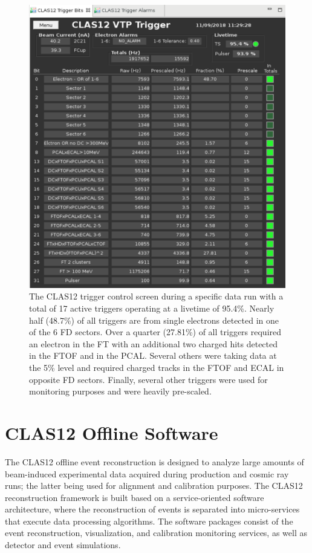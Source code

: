\documentclass[final,3p]{elsarticle}
\begin{document}
\begin{twocolumn}
\begin{figure}[t!]
\centerline{\includegraphics[width=1.0\columnwidth]{CLAS12-triggers.png}}
\caption{The CLAS12 trigger control screen during a specific data run with a total of 17 active triggers operating at
  a livetime of 95.4\%. Nearly half (48.7\%) of all triggers are from single electrons detected in one of the 6 FD
  sectors. Over a quarter (27.81\%) of all triggers required an electron in the FT with an additional two charged hits
  detected in the FTOF and in the PCAL. Several others were taking data at the 5\% level and required charged tracks
  in the FTOF and ECAL in opposite FD sectors. Finally, several other triggers were used for monitoring purposes and
  were heavily pre-scaled.}
\label{CLAS12-triggers}
\end{figure}

\section{CLAS12 Offline Software}  

The CLAS12 offline event reconstruction is designed to analyze large amounts of beam-induced experimental data
acquired during production and cosmic ray runs; the latter being used for alignment and calibration purposes. The
CLAS12 reconstruction framework is built based on a service-oriented software architecture, where the
reconstruction of events is separated into micro-services that execute data processing algorithms. The software
packages consist of the event reconstruction, visualization, and calibration monitoring services, as well as detector
and event simulations. 


\end{twocolumn}
\end{document}
